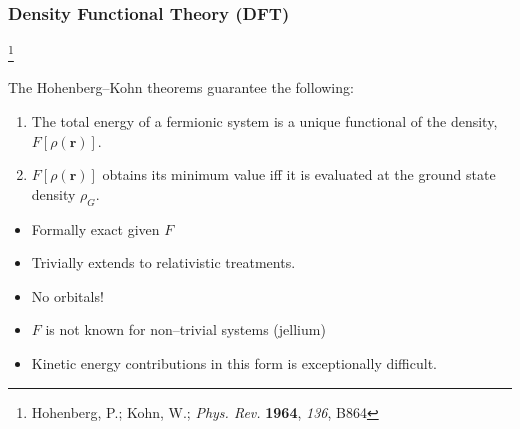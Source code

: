 \documentclass{beamer}
\newcommand\blfootnote[1]{%
  \begingroup
  \renewcommand\thefootnote{}\footnote{#1}%
  \addtocounter{footnote}{-1}%
  \endgroup
}
\begin{document}
\begin{frame}
\frametitle{Density Functional Theory (DFT)}
\blfootnote{Hohenberg, P.; Kohn, W.; \emph{Phys. Rev.} \textbf{1964}, \emph{136}, B864}

The Hohenberg--Kohn theorems guarantee the following:
\begin{enumerate}
  \item The total energy of a fermionic system is a unique functional of the density, $F[\rho(\mathbf{r})]$.
  \item $F[\rho(\mathbf{r})]$ obtains its minimum value iff it is evaluated at the ground state density $\rho_G$.
\end{enumerate}

\begin{itemize}
  \color{green}
  \item Formally exact given $F$
  \item Trivially extends to relativistic treatments.
  \item No orbitals!
\end{itemize}

\begin{itemize}
  \color{red}
  \item $F$ is not known for non--trivial systems (jellium)
  \item Kinetic energy contributions in this form is exceptionally difficult.
\end{itemize}

\end{frame}
\end{document}
